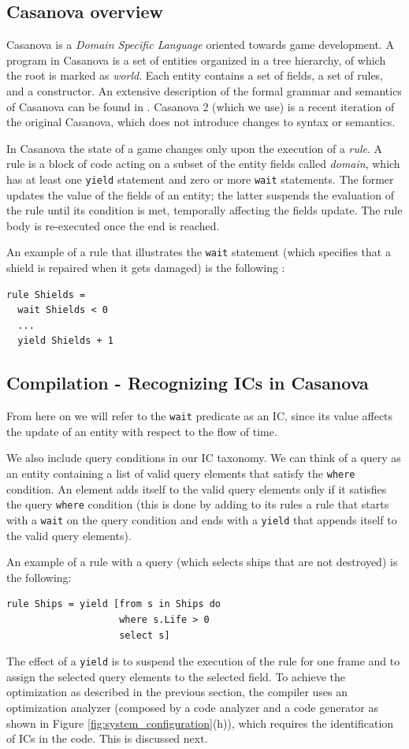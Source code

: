 \subsection{Casanova overview}
Casanova is a \textit{Domain Specific Language} oriented towards game development. A program in Casanova is a set of entities organized in a tree hierarchy, of which the root is marked as \textit{world}. Each entity contains a set of fields, a set of rules, and a constructor. An extensive description of the formal grammar and semantics of Casanova can be found in \cite{maggiore2013casanova}. Casanova 2 (which we use) is a recent iteration of the original Casanova, which does not introduce changes to syntax or semantics.

In Casanova the state of a game changes only upon the execution of a \textit{rule}. A rule is a block of code acting on a subset of the entity fields called \textit{domain}, which has at least one \texttt{yield} statement and zero or more \texttt{wait} statements. The former updates the value of the fields of an entity; the latter suspends the evaluation of the rule until its condition is met, temporally affecting the fields update. The rule body is re-executed once the end is reached.

An example of a rule that illustrates the \texttt{wait} statement (which specifies that a shield is repaired when it gets damaged) is the following :
\begin{lstlisting}
rule Shields = 
  wait Shields < 0
  ...
  yield Shields + 1
\end{lstlisting}

\subsection{Compilation - Recognizing ICs in Casanova}
From here on we will refer to the \texttt{wait} predicate as an IC, since its value affects the update of an entity with respect to the flow of time.

We also include query conditions in our IC taxonomy. We can think of a query as an entity containing a list of valid query elements that satisfy the \texttt{where} condition. An element adds itself to the valid query elements only if it satisfies the query \texttt{where} condition (this is done by adding to its rules a rule that starts with a \texttt{wait} on the query condition and ends with a \texttt{yield} that appends itself to the valid query elements).

An example of a rule with a query (which selects ships that are not destroyed) is the following:
\begin{lstlisting}
rule Ships = yield [from s in Ships do
                    where s.Life > 0
                    select s]
\end{lstlisting}
The effect of a \texttt{yield} is to suspend the execution of the rule for one frame and to assign the selected query elements to the selected field. To achieve the optimization as described in the previous section, the compiler uses an optimization analyzer (composed by a code analyzer and a code generator as shown in Figure \ref{fig:system_configuration}(h)), which requires the identification of ICs in the code. This is discussed next.

